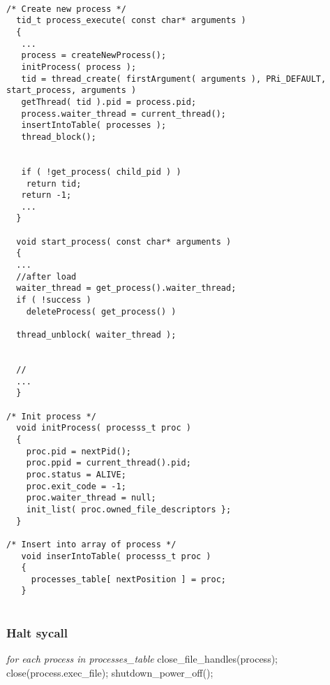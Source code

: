     \begin{lstlisting}
    
/* Create new process */
  tid_t process_execute( const char* arguments )
  {
   ...
   process = createNewProcess();
   initProcess( process );
   tid = thread_create( firstArgument( arguments ), PRi_DEFAULT, start_process, arguments )
   getThread( tid ).pid = process.pid;
   process.waiter_thread = current_thread();
   insertIntoTable( processes );
   thread_block();


   if ( !get_process( child_pid ) )
    return tid;
   return -1;
   ...
  }

  void start_process( const char* arguments )
  {
  ...
  //after load
  waiter_thread = get_process().waiter_thread;
  if ( !success )
    deleteProcess( get_process() )

  thread_unblock( waiter_thread );

  
  //
  ...
  }

/* Init process */
  void initProcess( processs_t proc )
  {
    proc.pid = nextPid();
    proc.ppid = current_thread().pid;
    proc.status = ALIVE;
    proc.exit_code = -1;
    proc.waiter_thread = null;
    init_list( proc.owned_file_descriptors };
  }

/* Insert into array of process */
   void inserIntoTable( processs_t proc )
   {
     processes_table[ nextPosition ] = proc;
   }
    
    \end{lstlisting}

    \subsubsection{Halt sycall}
    \vspace{-3em} %
      \begin{program}
	\textit{for each process in processes\_table}
	\hspace{30pt}close\_file\_handles(process);
	\hspace{30pt}close(process.exec\_file);
	shutdown\_power\_off();
      \end{program}


